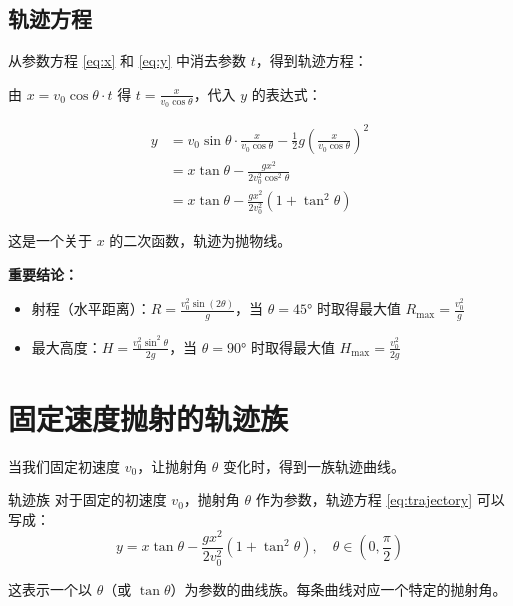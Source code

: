 \documentclass[a4paper,11pt]{ctexart}
\begin{document}
\begin{center}
\end{center}

\subsection{轨迹方程}

从参数方程 \eqref{eq:x} 和 \eqref{eq:y} 中消去参数 $t$，得到轨迹方程：

由 $x = v_0\cos\theta \cdot t$ 得 $t = \frac{x}{v_0\cos\theta}$，代入 $y$ 的表达式：

\begin{align}
    y &= v_0\sin\theta \cdot \frac{x}{v_0\cos\theta} - \frac{1}{2}g\left(\frac{x}{v_0\cos\theta}\right)^2 \nonumber\\
    &= x\tan\theta - \frac{gx^2}{2v_0^2\cos^2\theta} \nonumber\\
    &= x\tan\theta - \frac{gx^2}{2v_0^2}(1 + \tan^2\theta) \label{eq:trajectory}
\end{align}

这是一个关于 $x$ 的二次函数，轨迹为抛物线。

\textbf{重要结论：}
\begin{itemize}
    \item 射程（水平距离）：$R = \frac{v_0^2\sin(2\theta)}{g}$，当 $\theta = 45°$ 时取得最大值 $R_{\max} = \frac{v_0^2}{g}$
    \item 最大高度：$H = \frac{v_0^2\sin^2\theta}{2g}$，当 $\theta = 90°$ 时取得最大值 $H_{\max} = \frac{v_0^2}{2g}$
\end{itemize}

\section{固定速度抛射的轨迹族}

当我们固定初速度 $v_0$，让抛射角 $\theta$ 变化时，得到一族轨迹曲线。

\begin{definitionbox}{轨迹族}
对于固定的初速度 $v_0$，抛射角 $\theta$ 作为参数，轨迹方程 \eqref{eq:trajectory} 可以写成：
\begin{equation}
    y = x\tan\theta - \frac{gx^2}{2v_0^2}(1 + \tan^2\theta), \quad \theta \in \left(0, \frac{\pi}{2}\right) \label{eq:family}
\end{equation}

这表示一个以 $\theta$（或 $\tan\theta$）为参数的曲线族。每条曲线对应一个特定的抛射角。
\end{definitionbox}
\end{document}
